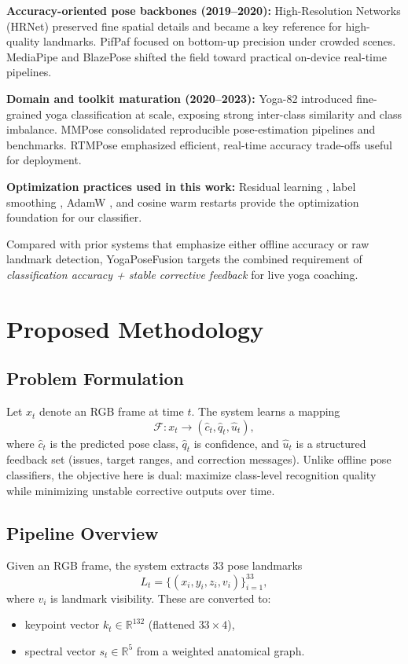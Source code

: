 \documentclass[conference]{IEEEtran}
\begin{document}
\textbf{Accuracy-oriented pose backbones (2019--2020):} High-Resolution Networks (HRNet) \cite{sun2019hrnet} preserved fine spatial details and became a key reference for high-quality landmarks. PifPaf \cite{kreiss2019pifpaf} focused on bottom-up precision under crowded scenes. MediaPipe \cite{lugaresi2019mediapipe} and BlazePose \cite{bazarevsky2020blazepose} shifted the field toward practical on-device real-time pipelines.

\textbf{Domain and toolkit maturation (2020--2023):} Yoga-82 \cite{verma2020yoga82} introduced fine-grained yoga classification at scale, exposing strong inter-class similarity and class imbalance. MMPose \cite{cai2020mmpose} consolidated reproducible pose-estimation pipelines and benchmarks. RTMPose \cite{jiang2023rtmpose} emphasized efficient, real-time accuracy trade-offs useful for deployment.

\textbf{Optimization practices used in this work:} Residual learning \cite{he2016resnet}, label smoothing \cite{szegedy2016inception}, AdamW \cite{loshchilov2017decoupled}, and cosine warm restarts \cite{loshchilov2016sgdr} provide the optimization foundation for our classifier.

Compared with prior systems that emphasize either offline accuracy or raw landmark detection, YogaPoseFusion targets the combined requirement of \emph{classification accuracy + stable corrective feedback} for live yoga coaching.

\section{Proposed Methodology}
\subsection{Problem Formulation}
Let $x_t$ denote an RGB frame at time $t$. The system learns a mapping
\begin{equation}
\mathcal{F}: x_t \rightarrow (\hat{c}_t, \hat{q}_t, \hat{u}_t),
\end{equation}
where $\hat{c}_t$ is the predicted pose class, $\hat{q}_t$ is confidence, and $\hat{u}_t$ is a structured feedback set (issues, target ranges, and correction messages). Unlike offline pose classifiers, the objective here is dual: maximize class-level recognition quality while minimizing unstable corrective outputs over time.

\subsection{Pipeline Overview}
Given an RGB frame, the system extracts 33 pose landmarks
\begin{equation}
L_t = \{(x_i, y_i, z_i, v_i)\}_{i=1}^{33},
\end{equation}
where $v_i$ is landmark visibility. These are converted to:
\begin{itemize}
\item keypoint vector $k_t \in \mathbb{R}^{132}$ (flattened $33 \times 4$),
\item spectral vector $s_t \in \mathbb{R}^{5}$ from a weighted anatomical graph.
\end{itemize}
\end{document}
